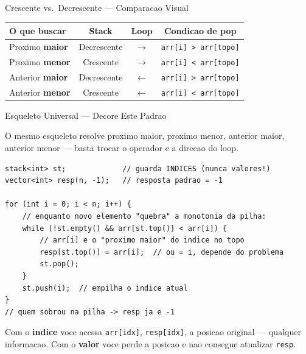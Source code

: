 \documentclass[aspectratio=169,11pt]{beamer}
\begin{document}
\begin{frame}[shrink=6]{Crescente vs.\ Decrescente --- Comparacao Visual}
  \vspace{0.1cm}
  \begin{tcolorbox}[caixaAzul,title={Tabela de Referencia Rapida}]
    \centering\small
    \begin{tabular}{lccc}
      \toprule
      \textbf{O que buscar} & \textbf{Stack} & \textbf{Loop} & \textbf{Condicao de pop}\\
      \midrule
      Proximo \textbf{maior}  & Decrescente & $\to$ & \texttt{arr[i] > arr[topo]}\\
      Proximo \textbf{menor}  & Crescente   & $\to$ & \texttt{arr[i] < arr[topo]}\\
      Anterior \textbf{maior} & Decrescente & $\leftarrow$ & \texttt{arr[i] > arr[topo]}\\
      Anterior \textbf{menor} & Crescente   & $\leftarrow$ & \texttt{arr[i] < arr[topo]}\\
      \bottomrule
    \end{tabular}
  \end{tcolorbox}
\end{frame}

\begin{frame}[fragile,shrink=8]{Esqueleto Universal --- Decore Este Padrao}
  \begin{tcolorbox}[caixaAzul,title={Padrao que resolve 80\% dos problemas de stack monotonica}]
    \small
    O mesmo esqueleto resolve proximo maior, proximo menor, anterior maior,
    anterior menor --- basta trocar o operador e a direcao do loop.
  \end{tcolorbox}
  \vspace{0.08cm}
  \begin{tcolorbox}[caixaCodigo]
    \begin{lstlisting}[style=cppcompact]
stack<int> st;             // guarda INDICES (nunca valores!)
vector<int> resp(n, -1);   // resposta padrao = -1

for (int i = 0; i < n; i++) {
    // enquanto novo elemento "quebra" a monotonia da pilha:
    while (!st.empty() && arr[st.top()] < arr[i]) {
        // arr[i] e o "proximo maior" do indice no topo
        resp[st.top()] = arr[i];  // ou = i, depende do problema
        st.pop();
    }
    st.push(i);  // empilha o indice atual
}
// quem sobrou na pilha -> resp ja e -1
    \end{lstlisting}
  \end{tcolorbox}
  \vspace{0.05cm}
  \begin{tcolorbox}[caixaAmarelo,title={Por que guardar indices e nao valores?}]
    \small
    Com o \textbf{indice} voce acessa \texttt{arr[idx]}, \texttt{resp[idx]},
    a posicao original --- qualquer informacao.
    Com o \textbf{valor} voce perde a posicao e nao consegue atualizar \texttt{resp}.
  \end{tcolorbox}
\end{frame}
\end{document}
